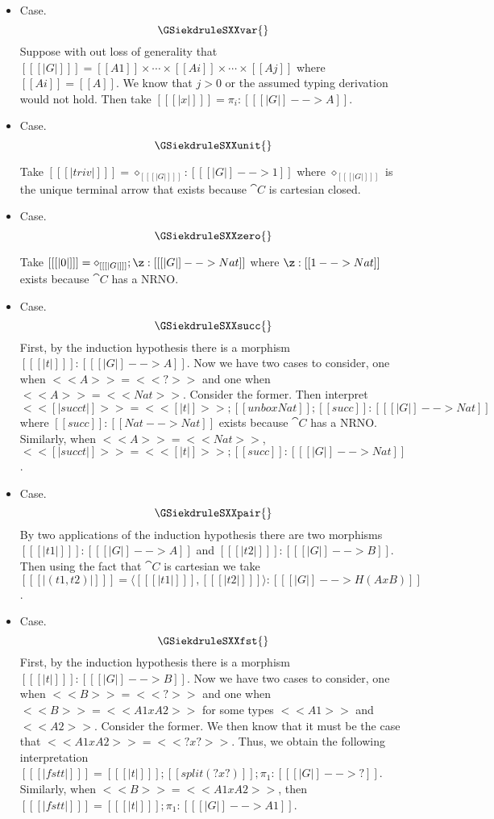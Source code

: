   \begin{itemize} 
  \item[] Case.
    \[
    \GSiekdruleSXXvar{}
    \]
    Suppose with out loss of generality that $[[ [| G |] ]] = [[A1]]
    \times \cdots \times [[Ai]] \times \cdots \times [[Aj]]$ where
    $[[Ai]] = [[A]]$.  We know that $j > 0$ or the assumed typing
    derivation would not hold.  Then take
    $[[ [| x |] ]] = \pi_i : [[ [| G |] --> A]]$.

  \item[] Case.
    \[
    \GSiekdruleSXXunit{}
    \]

    Take $[[ [| triv |] ]] = \diamond_{[[ [| G |] ]]} : [[ [| G |] -->
        1 ]]$ where $\diamond_{[[ [| G |] ]]}$ is the unique terminal
    arrow that exists because $\cat{C}$ is cartesian closed.
    
  \item[] Case.
    \[
    \GSiekdruleSXXzero{}
    \]

    Take $[[ [| 0 |] ]] = \diamond_{[[ [| G |] ]]};\z : [[ [| G |] --> Nat]]$
    where $\z : [[1 --> Nat]]$ exists because $\cat{C}$
    has a NRNO.

  \item[] Case.
    \[
    \GSiekdruleSXXsucc{}
    \]
    First, by the induction hypothesis there is a morphism $[[ [| t |] ]] : [[ [| G |] --> A]]$.
    Now we have two cases to consider, one when $<<A>> = <<?>>$ and one when $<<A>> = <<Nat>>$.
    Consider the former.  Then interpret
    $<< [| succ t |] >> = << [| t |] >>;[[ unbox Nat ]];[[succ]] : [[ [| G |] --> Nat]]$ where
    $[[succ]] : [[Nat --> Nat]]$ exists because $\cat{C}$ has a NRNO.  Similarly,
    when $<<A>> = <<Nat>>$, 
    $<< [| succ t |] >> = << [| t |] >>;[[succ]] : [[ [| G |] --> Nat]]$.
    
  \item[] Case.
    \[
    \GSiekdruleSXXpair{}
    \]
    By two applications of the induction hypothesis there are two morphisms
    $[[ [| t1 |] ]] : [[ [| G |] --> A]]$ and $[[ [| t2 |] ]] : [[ [| G |] --> B]]$.
    Then using the fact that $\cat{C}$ is cartesian we take
    $[[ [| (t1 , t2) |] ]] = \langle [[ [| t1 |] ]] , [[ [| t2 |] ]] \rangle : [[ [| G |] --> H(A x B)]]$.

  \item[] Case.
    \[
    \GSiekdruleSXXfst{}
    \]
    First, by the induction hypothesis there is a morphism $[[ [| t |] ]] : [[ [| G |] --> B]]$.
    Now we have two cases to consider, one when $<<B>> = <<?>>$ and one when $<<B>> = <<A1 x A2>>$
    for some types $<<A1>>$ and $<<A2>>$.  Consider the former.  We then know that it must
    be the case that $<<A1 x A2>> = <<? x ?>>$.  Thus, we obtain the following interpretation
    $[[ [| fst t |] ]] = [[ [| t |] ]];[[split (? x ?)]];\pi_1 : [[ [| G |] --> ?]]$.  Similarly,
    when $<<B>> = <<A1 x A2>>$, then
    $[[ [| fst t |] ]] = [[ [| t |] ]];\pi_1 : [[ [| G |] --> A1]]$.


\end{itemize}
